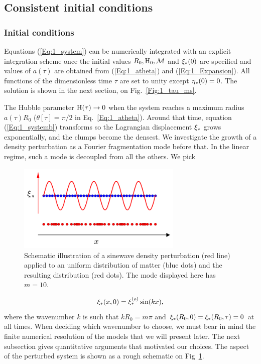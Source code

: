 \subsection{Consistent initial conditions} 
\subsubsection{Initial conditions} 
Equations (\ref{Eq:1_system}) can be numerically integrated with an explicit integration scheme once the initial values $R_0, {\textrm{H}}_0, {\cal M}$ and $\xi_\ast(0)$ are specified and values of $a(\tau)$ are obtained from (\ref{Eq:1_atheta}) and (\ref{Eq:1_Expansion}). All functions of the dimensionless time $\tau$ are set to unity except $\eta_\ast(0) = 0$. The solution is shown in the next section,  on Fig.~\ref{Fig:1_tau_ms}.


The Hubble parameter ${\textrm{H}}(\tau) \rightarrow 0$ when the system reaches a maximum radius $a(\tau)R_0$ ($\theta[\tau]=\pi/2$ in Eq.~\ref{Eq:1_atheta}). Around that time, equation (\ref{Eq:1_systemb}) transforms so the Lagrangian displacement $\xi_\ast$ grows exponentially, and the clumps become the densest. We investigate the growth of a density perturbation as a Fourier fragmentation mode before that. In the linear regime, such a mode is decoupled from all the others. We pick 

 \begin{figure}
	\center
 	\includegraphics[width=0.7\textwidth]{Figures/1_perturbation.png}
	\caption[Schematic illustration of a sinewave density perturbation]{Schematic illustration of a sinewave density perturbation (red line) applied to an uniform distribution of matter (blue dots) and the resulting distribution (red dots). The mode displayed here has $m=10$.} 
	\label{Fig:1_perturbation}
\end{figure}

\begin{equation} 
\label{Eq:1_FourierMode} 
   \xi_\ast(x,0) = \xi_\ast^{(o)} \sin( kx ) ,
\end{equation}  
where the wavenumber $k$ is such that $k R_0 = m \pi$ and $\xi_\ast(R_0,0) = \xi_\ast(R_0,\tau) = 0$ at all times. When deciding which wavenumber to choose, we must bear in mind the finite numerical resolution of the models that we will present later. The next subsection gives quantitative arguments that motivated our choices.  
The aspect of the perturbed system is shown as a rough schematic on Fig~\ref{Fig:1_perturbation}.

